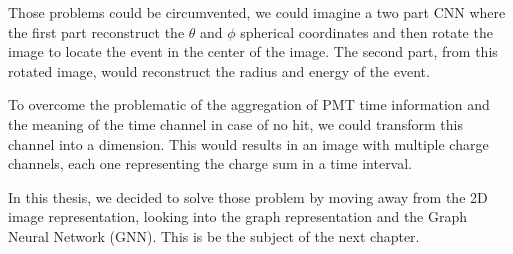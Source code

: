 \documentclass[../main.tex]{subfiles}
\begin{document}
Those problems could be circumvented, we could imagine a two part CNN where the first part reconstruct the $\theta$ and $\phi$ spherical coordinates and then rotate the image to locate the event in the center of the image. The second part, from this rotated image, would reconstruct the radius and energy of the event.

To overcome the problematic of the aggregation of PMT time information and the meaning of the time channel in case of no hit, we could transform this channel into a dimension. This would results in an image with multiple charge channels, each one representing the charge sum in a time interval.

In this thesis, we decided to solve those problem by moving away from the 2D image representation, looking into the graph representation and the Graph Neural Network (GNN). This is be the subject of the next chapter.
\end{document}
